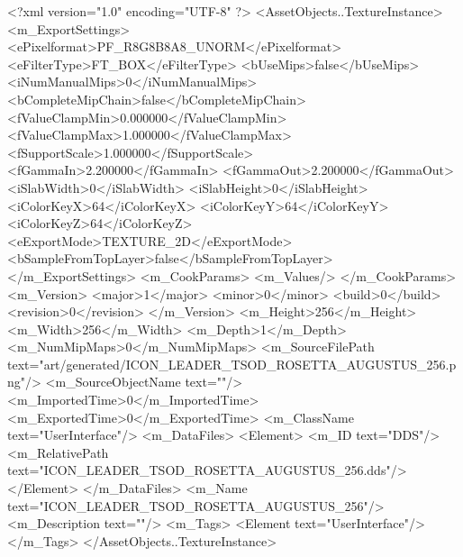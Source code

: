 <?xml version="1.0" encoding="UTF-8" ?>
<AssetObjects..TextureInstance>
	<m_ExportSettings>
		<ePixelformat>PF_R8G8B8A8_UNORM</ePixelformat>
		<eFilterType>FT_BOX</eFilterType>
		<bUseMips>false</bUseMips>
		<iNumManualMips>0</iNumManualMips>
		<bCompleteMipChain>false</bCompleteMipChain>
		<fValueClampMin>0.000000</fValueClampMin>
		<fValueClampMax>1.000000</fValueClampMax>
		<fSupportScale>1.000000</fSupportScale>
		<fGammaIn>2.200000</fGammaIn>
		<fGammaOut>2.200000</fGammaOut>
		<iSlabWidth>0</iSlabWidth>
		<iSlabHeight>0</iSlabHeight>
		<iColorKeyX>64</iColorKeyX>
		<iColorKeyY>64</iColorKeyY>
		<iColorKeyZ>64</iColorKeyZ>
		<eExportMode>TEXTURE_2D</eExportMode>
		<bSampleFromTopLayer>false</bSampleFromTopLayer>
	</m_ExportSettings>
	<m_CookParams>
		<m_Values/>
	</m_CookParams>
	<m_Version>
		<major>1</major>
		<minor>0</minor>
		<build>0</build>
		<revision>0</revision>
	</m_Version>
	<m_Height>256</m_Height>
	<m_Width>256</m_Width>
	<m_Depth>1</m_Depth>
	<m_NumMipMaps>0</m_NumMipMaps>
	<m_SourceFilePath text="art/generated/ICON_LEADER_TSOD_ROSETTA_AUGUSTUS_256.png"/>
	<m_SourceObjectName text=""/>
	<m_ImportedTime>0</m_ImportedTime>
	<m_ExportedTime>0</m_ExportedTime>
	<m_ClassName text="UserInterface"/>
	<m_DataFiles>
		<Element>
			<m_ID text="DDS"/>
			<m_RelativePath text="ICON_LEADER_TSOD_ROSETTA_AUGUSTUS_256.dds"/>
		</Element>
	</m_DataFiles>
	<m_Name text="ICON_LEADER_TSOD_ROSETTA_AUGUSTUS_256"/>
	<m_Description text=""/>
	<m_Tags>
		<Element text="UserInterface"/>
	</m_Tags>
</AssetObjects..TextureInstance>
